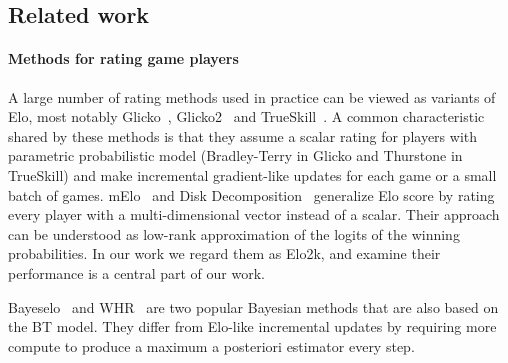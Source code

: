 



\subsection{Related work}

\paragraph{Methods for rating game players} A large number of rating methods used in practice can be viewed as variants of Elo, most notably Glicko~\citep{glickman1995glicko}, Glicko2~\citep{glickman2012example} and TrueSkill~\citep{herbrich2006trueskill}. A common characteristic shared by these methods is that they assume a scalar rating for players with parametric probabilistic model (Bradley-Terry in Glicko and Thurstone in TrueSkill) and make incremental gradient-like updates for each game or a small batch of games. 
mElo~\citep{balduzzi2018re} and Disk Decomposition~\citep{bertrand2023limitations} generalize Elo score by rating every player with a multi-dimensional vector instead of a scalar. Their approach can be understood as low-rank approximation of the logits of the winning probabilities. In our work we regard them as Elo2k, and examine their performance is a central part of our work.


Bayeselo~\citep{bayeselo} and WHR~\citep{coulom2008whole} are two popular Bayesian methods that are also based on the BT model. They differ from Elo-like incremental updates by requiring more compute to produce a maximum a posteriori estimator every step. 


